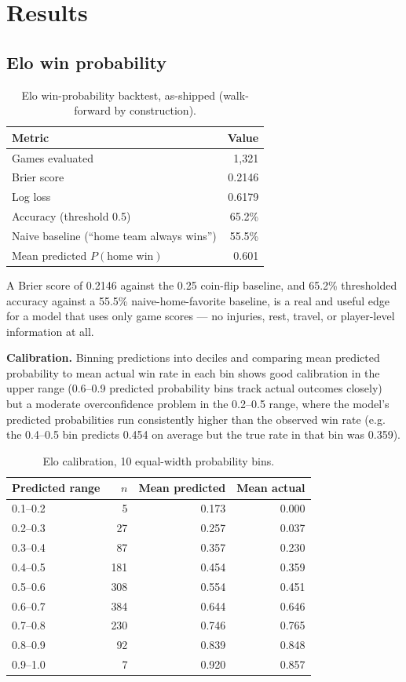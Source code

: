 \documentclass[11pt]{article}
\begin{document}
\section{Results}

\subsection{Elo win probability}
\label{sec:elo}

\begin{table}[h]
\centering
\begin{tabular}{lr}
\toprule
Metric & Value \\
\midrule
Games evaluated & 1,321 \\
Brier score & 0.2146 \\
Log loss & 0.6179 \\
Accuracy (threshold 0.5) & 65.2\% \\
Naive baseline (``home team always wins'') & 55.5\% \\
Mean predicted $P(\text{home win})$ & 0.601 \\
\bottomrule
\end{tabular}
\caption{Elo win-probability backtest, as-shipped (walk-forward by construction).}
\end{table}

A Brier score of 0.2146 against the 0.25 coin-flip baseline, and 65.2\% thresholded accuracy against a 55.5\%
naive-home-favorite baseline, is a real and useful edge for a model that uses only game scores — no injuries,
rest, travel, or player-level information at all.

\textbf{Calibration.} Binning predictions into deciles and comparing mean predicted probability to mean
actual win rate in each bin shows good calibration in the upper range (0.6--0.9 predicted probability bins
track actual outcomes closely) but a moderate overconfidence problem in the 0.2--0.5 range, where the model's
predicted probabilities run consistently higher than the observed win rate (e.g. the 0.4--0.5 bin predicts
0.454 on average but the true rate in that bin was 0.359).

\begin{table}[h]
\centering
\small
\begin{tabular}{lrrr}
\toprule
Predicted range & $n$ & Mean predicted & Mean actual \\
\midrule
0.1--0.2 & 5 & 0.173 & 0.000 \\
0.2--0.3 & 27 & 0.257 & 0.037 \\
0.3--0.4 & 87 & 0.357 & 0.230 \\
0.4--0.5 & 181 & 0.454 & 0.359 \\
0.5--0.6 & 308 & 0.554 & 0.451 \\
0.6--0.7 & 384 & 0.644 & 0.646 \\
0.7--0.8 & 230 & 0.746 & 0.765 \\
0.8--0.9 & 92 & 0.839 & 0.848 \\
0.9--1.0 & 7 & 0.920 & 0.857 \\
\bottomrule
\end{tabular}
\caption{Elo calibration, 10 equal-width probability bins.}
\end{table}
\end{document}
